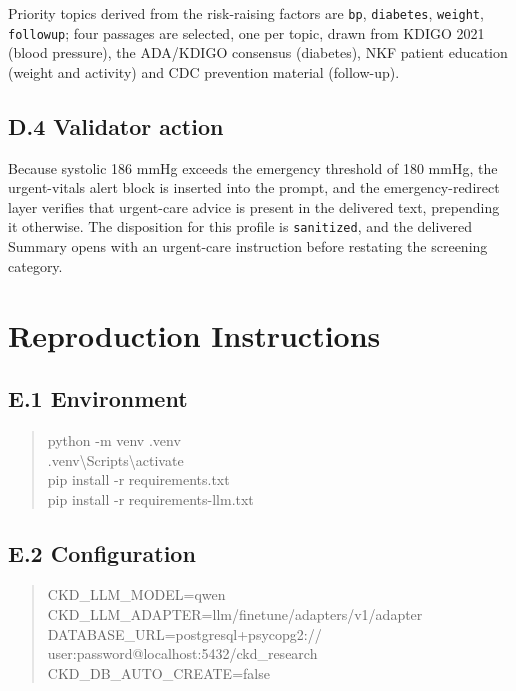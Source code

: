 Priority topics derived from the risk-raising factors are
\texttt{bp}, \texttt{diabetes}, \texttt{weight}, \texttt{followup}; four
passages are selected, one per topic, drawn from KDIGO 2021 (blood pressure),
the ADA/KDIGO consensus (diabetes), NKF patient education (weight and activity)
and CDC prevention material (follow-up).

\section*{D.4 Validator action}

Because systolic 186 mmHg exceeds the emergency threshold of 180 mmHg, the
urgent-vitals alert block is inserted into the prompt, and the emergency-redirect
layer verifies that urgent-care advice is present in the delivered text,
prepending it otherwise. The disposition for this profile is
\texttt{sanitized}, and the delivered Summary opens with an urgent-care
instruction before restating the screening category.

\chapter{Reproduction Instructions}
\label{app:repro}

\section*{E.1 Environment}

\begin{quote}\footnotesize\ttfamily\raggedright
python -m venv .venv \\
.venv\textbackslash Scripts\textbackslash activate \\
pip install -r requirements.txt \\
pip install -r requirements-llm.txt
\end{quote}

\section*{E.2 Configuration}

\begin{quote}\footnotesize\ttfamily\raggedright
CKD\_LLM\_MODEL=qwen \\
CKD\_LLM\_ADAPTER=llm/finetune/adapters/v1/adapter \\
DATABASE\_URL=postgresql+psycopg2:// \\
\hspace*{2em}user:password@localhost:5432/ckd\_research \\
CKD\_DB\_AUTO\_CREATE=false
\end{quote}

